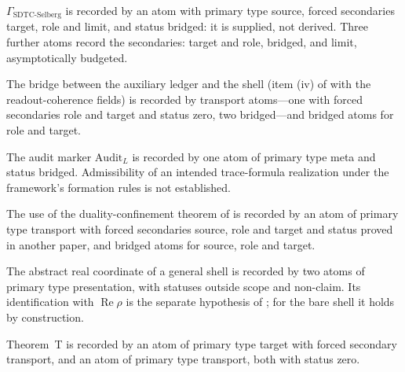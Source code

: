 \documentclass[11pt]{article}
\DeclareMathOperator{\Real}{Re}
\newcommand{\GamSDTCSelberg}{\Gamma_{\mathrm{SDTC\text{-}Selberg}}}
\theoremstyle{definition}
\begin{document}
\begin{classification}
\label{thm:rh:aor-recognition-discharge}
\(\GamSDTCSelberg\) is recorded by an atom with primary type source,
forced secondaries target, role and limit, and status bridged: it is
supplied, not derived.  Three further atoms record the secondaries:
target and role, bridged, and limit, asymptotically budgeted.
\end{classification}

\begin{classification}
\label{thm:rh:aor-gamma-bridge-discharge}
The bridge between the auxiliary ledger and the shell (item (iv) of
 with the readout-coherence fields) is
recorded by transport atoms---one with forced secondaries role and
target and status zero, two bridged---and bridged atoms for role and
target.
\end{classification}

\begin{classification}
\label{thm:rh:aor-auditL-discharge}
The audit marker \(\mathrm{Audit}_L\) is recorded by one atom of
primary type meta and status bridged.  Admissibility of an intended
trace-formula realization under the framework's formation rules is not
established.
\end{classification}

\begin{classification}
\label{thm:rh:aor-dc-master-import-discharge}
The use of the duality-confinement theorem of \citet{TsiokosSDTC2026}
is recorded by an atom of primary type transport with forced
secondaries source, role and target and status proved in another
paper, and bridged atoms for source, role and target.
\end{classification}

\begin{classification}
\label{thm:rh:aor-real-coordinate-discharge}
The abstract real coordinate of a general shell is recorded by two
atoms of primary type presentation, with statuses outside scope and
non-claim.  Its identification with \(\Real\rho\) is the separate
hypothesis of ; for the bare shell it holds
by construction.
\end{classification}

\begin{classification}
\label{thm:rh:aor-translation-interface-discharge}
Theorem~T is recorded by an atom of primary type target with forced
secondary transport, and an atom of primary type transport, both with
status zero.
\end{classification}
\end{document}

